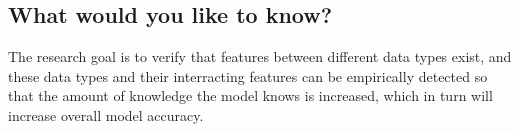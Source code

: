 \subsection{What would you like to know?}

The research goal is to verify that features between different data types exist, and these data types and their interracting features can be empirically detected so that the amount of knowledge the model knows is increased, which in turn will increase overall model accuracy.  



